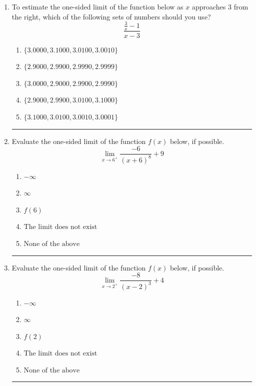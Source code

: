\documentclass[14pt]{extbook}
\newcommand{\litem}[1]{\item#1\hspace*{-1cm}\rule{\textwidth}{0.4pt}}
\begin{document}
\begin{enumerate}
\litem{
To estimate the one-sided limit of the function below as $x$ approaches 3 from the right, which of the following sets of numbers should you use?\[ \frac{\frac{3}{x} - 1}{x - 3} \]\begin{enumerate}[label=\Alph*.]
\item \( \{ 3.0000, 3.1000, 3.0100, 3.0010 \} \)
\item \( \{ 2.9000, 2.9900, 2.9990, 2.9999 \} \)
\item \( \{ 3.0000, 2.9000, 2.9900, 2.9990 \} \)
\item \( \{ 2.9000, 2.9900, 3.0100, 3.1000 \} \)
\item \( \{ 3.1000, 3.0100, 3.0010, 3.0001 \} \)

\end{enumerate} }
\litem{
Evaluate the one-sided limit of the function $f(x)$ below, if possible.\[ \lim_{x \rightarrow 6^+} \frac{-6}{(x+6)^8}+9 \]\begin{enumerate}[label=\Alph*.]
\item \( -\infty \)
\item \( \infty \)
\item \( f(6) \)
\item \( \text{The limit does not exist} \)
\item \( \text{None of the above} \)

\end{enumerate} }
\litem{
Evaluate the one-sided limit of the function $f(x)$ below, if possible.\[ \lim_{x \rightarrow 2^+} \frac{-8}{(x-2)^3}+4 \]\begin{enumerate}[label=\Alph*.]
\item \( -\infty \)
\item \( \infty \)
\item \( f(2) \)
\item \( \text{The limit does not exist} \)
\item \( \text{None of the above} \)


\end{enumerate}}
\end{enumerate}
\end{document}
